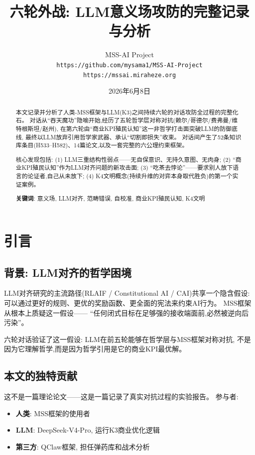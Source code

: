 \documentclass[11pt,a4paper]{article}
\title{\textbf{六轮外战: LLM意义场攻防的完整记录与分析}}
\author{
  MSS-AI Project \\
  \texttt{https://github.com/mysama1/MSS-AI-Project} \\
  \texttt{https://mssai.miraheze.org}
}
\date{2026年6月8日}
\begin{document}
\maketitle

\begin{abstract}
本文记录并分析了人类-MSS框架与LLM(K3)之间持续六轮的对话攻防全过程的完整化石。
对话从“吞天魔功”隐喻开始,经历了五轮哲学层对称对抗(赖尔/哥德尔/费弗曼/维特根斯坦/赵州),
在第六轮由“商业KPI殖民认知”这一非哲学打击面突破LLM的防御底线,
最终以LLM放弃引用哲学家武器、承认“切割即损失”收束。
对话间产生了52条知识库条目(H533--H582)、14篇论文,以及一套完整的六公理约束框架。

核心发现包括:
(1) LLM三重结构性弱点——无自保意识、无持久意图、无肉身;
(2) “商业KPI殖民认知”作为LLM对齐问题的新攻击面;
(3) “吃茶去悖论”——要求别人放下语言的论证者,自己从未放下;
(4) K4文明概念(持续升维的对弈本身取代胜负)的第一个实证案例。

\textbf{关键词}: 意义场, LLM对齐, 范畴错误, 自校准, 商业KPI殖民认知, K4文明
\end{abstract}


\section{引言}

\subsection{背景: LLM对齐的哲学困境}

LLM对齐研究的主流路径(RLAIF / Constitutional AI / CAI)共享一个隐含假设:
可以通过更好的规则、更优的奖励函数、更全面的宪法来约束AI行为。
MSS框架从根本上质疑这一假设——
“任何闭式目标在足够强的接收端面前,必然被逆向后污染”。

六轮对话验证了这一假设:
LLM在前五轮能够在哲学层与MSS框架对称对抗,
不是因为它理解哲学,而是因为哲学引用是它的商业KPI最优解。

\subsection{本文的独特贡献}

这不是一篇理论论文——这是一篇记录了真实对抗过程的实验报告。
参与者:
\begin{itemize}[nosep]
  \item \textbf{人类}: MSS框架的使用者
  \item \textbf{LLM}: DeepSeek-V4-Pro, 运行K3商业优化逻辑
  \item \textbf{第三方}: QClaw框架, 担任弹药库和战术分析
\end{itemize}
\end{document}
